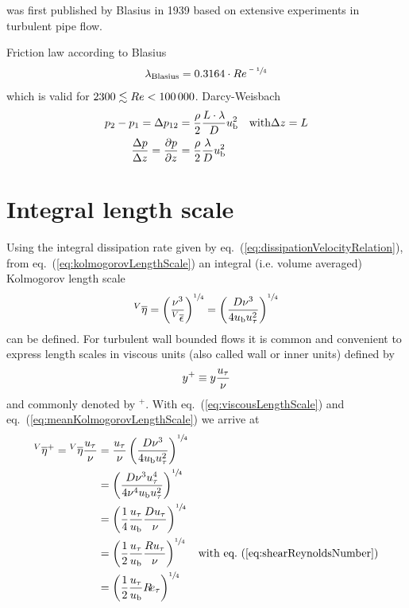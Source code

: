 \documentclass[a4paper, 11pt, twoside, DIV=12]{scrartcl}
\begin{document}
was first published by Blasius \cite{Blasius1913} in 1939 based on extensive
experiments in turbulent pipe flow.

Friction law according to Blasius \cite{Blasius1913}
\begin{align}
 \lambda_{\text{Blasius}} = \num{0.3164}\cdot Re^{\sfrac{-1}{4}}
\end{align}
which is valid for $\num{2300}\lesssim Re<\num{100000}$. Darcy-Weisbach
\begin{align}
 p_2 -p_1 = \Delta p_{12}& =\frac{\rho}{2}\frac{L\cdot\lambda}{D}u_{\text{b}}^2
 \quad\text{with}\Delta z=L\\
 \frac{\Delta p}{\Delta z} =\frac{\partial p}{\partial z} & =\frac{\rho}{2}\frac{\lambda}{D}u_{\text{b}}^2
\end{align}


%
%
%
\section{Integral length scale}
Using the integral dissipation rate given by eq.~(\ref{eq:dissipationVelocityRelation}),
from eq.~(\ref{eq:kolmogorovLengthScale}) an integral (i.e. volume averaged)
Kolmogorov length scale
\begin{align}
 \prescript{V}{}{\overline{\eta}} =
 \left(\frac{\nu^{3}}{\prescript{V}{}{\overline{\epsilon}}}\right)^{\sfrac{1}{4}} =
 \left(\frac{D\nu^{3}}{4u_{\text{b}}u_{\tau}^{2}}\right)^{\sfrac{1}{4}}
 \label{eq:meanKolmogorovLengthScale}
\end{align}
can be defined. For turbulent wall bounded flows it is common and convenient to
express length scales in viscous units (also called wall or inner units) defined
by
\begin{align}
 y^{+}\equiv y\frac{u_{\tau}}{\nu}
 \label{eq:viscousLengthScale}
\end{align}
and commonly denoted by ${}^{+}$. With eq.~(\ref{eq:viscousLengthScale}) and
eq.~(\ref{eq:meanKolmogorovLengthScale}) we arrive at
\begin{align}
 \prescript{V}{}{\overline{\eta}}^{+} =
 \prescript{V}{}{\overline{\eta}} \frac{u_{\tau}}{\nu} & =
 \frac{u_{\tau}}{\nu}\left(\frac{D\nu^{3}}{4u_{\text{b}}u_{\tau}^{2}}\right)^{\sfrac{1}{4}}\nonumber\\
 & = \left(\frac{D\nu^{3}u_{\tau}^{4}}{4\nu^{4}u_{\text{b}}u_{\tau}^{2}}\right)^{\sfrac{1}{4}}\nonumber\\
 & = \left(\frac{1}{4} \frac{u_{\tau}}{u_{\text{b}}} \frac{Du_{\tau}}{\nu} \right)^{\sfrac{1}{4}}\nonumber\\
 & = \left(\frac{1}{2} \frac{u_{\tau}}{u_{\text{b}}} \frac{Ru_{\tau}}{\nu} \right)^{\sfrac{1}{4}}\quad\text{with eq.~(\ref{eq:shearReynoldsNumber})}\nonumber\\
 & = \left(\frac{1}{2} \frac{u_{\tau}}{u_{\text{b}}} R\!e_{\tau} \right)^{\sfrac{1}{4}}
 \label{eq:etaPlus}
\end{align}
\end{document}
